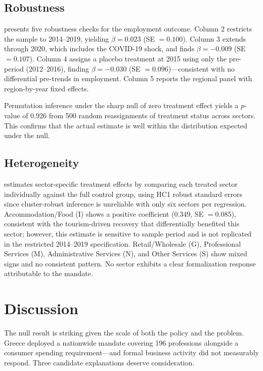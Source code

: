 \documentclass[12pt]{article}
\begin{document}
\subsection{Robustness}



 presents five robustness checks for the employment outcome. Column 2 restricts the sample to 2014--2019, yielding $\beta = 0.023$ (SE $= 0.100$). Column 3 extends through 2020, which includes the COVID-19 shock, and finds $\beta = -0.009$ (SE $= 0.107$). Column 4 assigns a placebo treatment at 2015 using only the pre-period (2012--2016), finding $\beta = -0.030$ (SE $= 0.096$)---consistent with no differential pre-trends in employment. Column 5 reports the regional panel with region-by-year fixed effects.

Permutation inference under the sharp null of zero treatment effect yields a $p$-value of 0.926 from 500 random reassignments of treatment status across sectors. This confirms that the actual estimate is well within the distribution expected under the null.

\subsection{Heterogeneity}



 estimates sector-specific treatment effects by comparing each treated sector individually against the full control group, using HC1 robust standard errors since cluster-robust inference is unreliable with only six sectors per regression. Accommodation/Food (I) shows a positive coefficient ($0.349$, SE $= 0.085$), consistent with the tourism-driven recovery that differentially benefited this sector; however, this estimate is sensitive to sample period and is not replicated in the restricted 2014--2019 specification. Retail/Wholesale (G), Professional Services (M), Administrative Services (N), and Other Services (S) show mixed signs and no consistent pattern. No sector exhibits a clear formalization response attributable to the mandate.


\section{Discussion}

The null result is striking given the scale of both the policy and the problem. Greece deployed a nationwide mandate covering 196 professions alongside a consumer spending requirement---and formal business activity did not measurably respond. Three candidate explanations deserve consideration.
\end{document}
